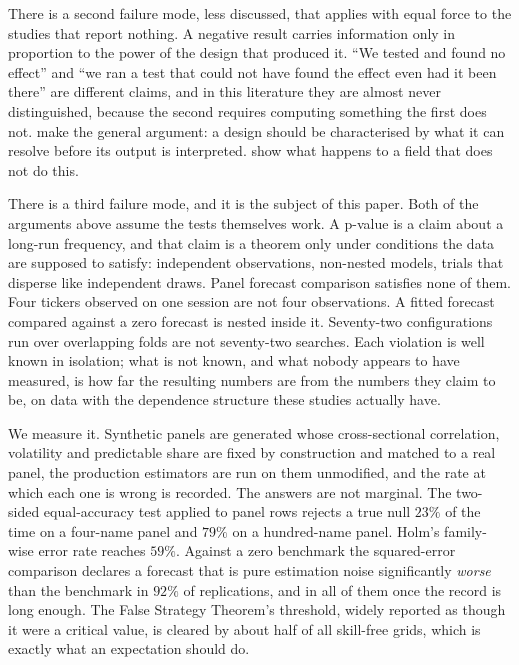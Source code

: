\documentclass{article}
\theoremstyle{plain}
\theoremstyle{remark}
\begin{document}
There is a second failure mode, less discussed, that applies with equal force to
the studies that report nothing. A negative result carries information only in
proportion to the power of the design that produced it. ``We tested and found no
effect'' and ``we ran a test that could not have found the effect even had it
been there'' are different claims, and in this literature they are almost never
distinguished, because the second requires computing something the first does
not. \citet{gelman2014} make the general argument: a design should be
characterised by what it can resolve before its output is interpreted.
\citet{button2013} show what happens to a field that does not do this.

There is a third failure mode, and it is the subject of this paper. Both of the
arguments above assume the tests themselves work. A p-value is a claim about a
long-run frequency, and that claim is a theorem only under conditions the data
are supposed to satisfy: independent observations, non-nested models, trials
that disperse like independent draws. Panel forecast comparison satisfies none
of them. Four tickers observed on one session are not four observations. A
fitted forecast compared against a zero forecast is nested inside it. Seventy-two
configurations run over overlapping folds are not seventy-two searches. Each
violation is well known in isolation; what is not known, and what nobody appears
to have measured, is how far the resulting numbers are from the numbers they
claim to be, on data with the dependence structure these studies actually have.

We measure it. Synthetic panels are generated whose cross-sectional
correlation, volatility and predictable share are fixed by construction and
matched to a real panel, the production estimators are run on them unmodified,
and the rate at which each one is wrong is recorded. The answers are not
marginal. The two-sided equal-accuracy test applied to panel rows rejects a true
null $23\%$ of the time on a four-name panel and $79\%$ on a hundred-name panel.
Holm's family-wise error rate reaches $59\%$. Against a zero benchmark the
squared-error comparison declares a forecast that is pure estimation noise
significantly \emph{worse} than the benchmark in $92\%$ of replications, and in
all of them once the record is long enough. The False Strategy Theorem's
threshold, widely reported as though it were a critical value, is cleared by
about half of all skill-free grids, which is exactly what an expectation should
do.
\end{document}
